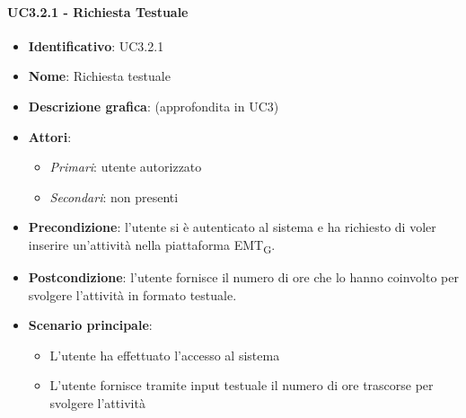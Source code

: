 \paragraph{UC3.2.1 - Richiesta Testuale}
\begin{itemize}
   \item \textbf{Identificativo}: UC3.2.1
   \item \textbf{Nome}: Richiesta testuale
   \item \textbf{Descrizione grafica}: (approfondita in UC3)
   \item \textbf{Attori}:
   \begin{itemize} 
       \item \textit{Primari}: utente autorizzato
       \item \textit{Secondari}: non presenti
   \end{itemize}
       \item \textbf{Precondizione}: l'utente si è autenticato al sistema e ha richiesto di voler inserire un'attività nella piattaforma EMT\textsubscript{G}. 
       \item \textbf{Postcondizione}: l'utente fornisce il numero di ore che lo hanno coinvolto per svolgere l'attività in formato testuale. 
    \item \textbf{Scenario principale}: 
       \begin{itemize}
           \item L'utente ha effettuato l'accesso al sistema 
           \item L'utente fornisce tramite input testuale il numero di ore trascorse per svolgere l'attività
       \end{itemize}
\end{itemize}

